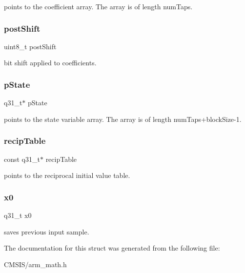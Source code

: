 points to the coefficient array. The array is of length num\+Taps. \mbox{\label{structarm__lms__norm__instance__q31_a74050e9f36542bd56f4052381a82ae8f}} 
\subsubsection{\texorpdfstring{postShift}{postShift}}
{\footnotesize\ttfamily uint8\+\_\+t post\+Shift}

bit shift applied to coefficients. \mbox{\label{structarm__lms__norm__instance__q31_adee4ba3ee8869865af7d8fa08ca913d6}} 
\subsubsection{\texorpdfstring{pState}{pState}}
{\footnotesize\ttfamily q31\+\_\+t$\ast$ p\+State}

points to the state variable array. The array is of length num\+Taps+block\+Size-\/1. \mbox{\label{structarm__lms__norm__instance__q31_ac2e860f11b18d416a6b9aeb4660694dc}} 
\subsubsection{\texorpdfstring{recipTable}{recipTable}}
{\footnotesize\ttfamily const q31\+\_\+t$\ast$ recip\+Table}

points to the reciprocal initial value table. \mbox{\label{structarm__lms__norm__instance__q31_a973b8350a0c7b113a5f002bc0b86bf76}} 
\subsubsection{\texorpdfstring{x0}{x0}}
{\footnotesize\ttfamily q31\+\_\+t x0}

saves previous input sample. 

The documentation for this struct was generated from the following file\+:\begin{DoxyCompactItemize}
\item 
C\+M\+S\+I\+S/arm\+\_\+math.\+h\end{DoxyCompactItemize}

